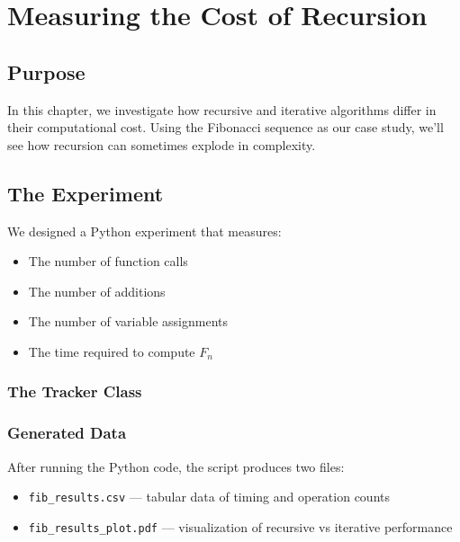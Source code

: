 \chapter{Measuring the Cost of Recursion}

\section{Purpose}
In this chapter, we investigate how recursive and iterative algorithms differ in their computational cost. Using the Fibonacci sequence as our case study, we’ll see how recursion can sometimes explode in complexity.

\section{The Experiment}
We designed a Python experiment that measures:
\begin{itemize}
  \item The number of function calls
  \item The number of additions
  \item The number of variable assignments
  \item The time required to compute $F_n$
\end{itemize}

\subsection{The Tracker Class}


\subsection{Generated Data}
After running the Python code, the script produces two files:
\begin{itemize}
  \item \texttt{fib\_results.csv} — tabular data of timing and operation counts
  \item \texttt{fib\_results\_plot.pdf} — visualization of recursive vs iterative performance
\end{itemize}

